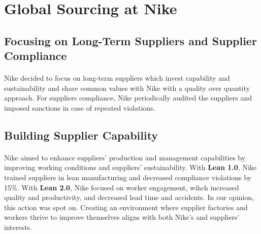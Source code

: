 \section{Global Sourcing at Nike}

\subsection{Focusing on Long-Term Suppliers and Supplier Compliance}

\paragraph{} Nike decided to focus on long-term suppliers which invest capability and sustainability and share common values with Nike with a quality over quantity approach. For suppliers compliance, Nike periodically audited the suppliers and imposed sanctions in case of repeated violations.

\subsection{Building Supplier Capability}

\paragraph{} Nike aimed to enhance suppliers' production and management capabilities by improving working conditions and suppliers' sustainability. With \textbf{Lean 1.0}, Nike trained suppliers in lean manufacturing and decreased compliance violations by 15\%. With \textbf{Lean 2.0}, Nike focused on worker engagement, wihch increased quality and productivity, and decreased lead time and accidents. In our opinion, this action was spot on. Creating an environment where supplier factories and workers thrive to improve themselves aligns with both Nike's and suppliers' interests.